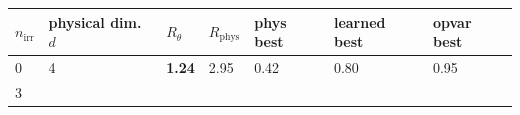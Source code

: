 \documentclass[11pt]{article}
\begin{document}
\begin{longtable}[]{@{}lllllll@{}}
\toprule
\begin{minipage}[b]{0.12\columnwidth}\raggedright
\(n_{\text{irr}}\)\strut
\end{minipage} & \begin{minipage}[b]{0.12\columnwidth}\raggedright
physical dim. \(d\)\strut
\end{minipage} & \begin{minipage}[b]{0.12\columnwidth}\raggedright
\(R_\theta\)\strut
\end{minipage} & \begin{minipage}[b]{0.12\columnwidth}\raggedright
\(R_{\text{phys}}\)\strut
\end{minipage} & \begin{minipage}[b]{0.12\columnwidth}\raggedright
phys best\strut
\end{minipage} & \begin{minipage}[b]{0.12\columnwidth}\raggedright
learned best\strut
\end{minipage} & \begin{minipage}[b]{0.12\columnwidth}\raggedright
opvar best\strut
\end{minipage}\tabularnewline
\midrule
\endhead
\begin{minipage}[t]{0.12\columnwidth}\raggedright
0\strut
\end{minipage} & \begin{minipage}[t]{0.12\columnwidth}\raggedright
4\strut
\end{minipage} & \begin{minipage}[t]{0.12\columnwidth}\raggedright
\textbf{1.24}\strut
\end{minipage} & \begin{minipage}[t]{0.12\columnwidth}\raggedright
2.95\strut
\end{minipage} & \begin{minipage}[t]{0.12\columnwidth}\raggedright
0.42\strut
\end{minipage} & \begin{minipage}[t]{0.12\columnwidth}\raggedright
0.80\strut
\end{minipage} & \begin{minipage}[t]{0.12\columnwidth}\raggedright
0.95\strut
\end{minipage}\tabularnewline
\begin{minipage}[t]{0.12\columnwidth}\raggedright
3\strut
\end{minipage} & \begin{minipage}[t]{0.12\columnwidth}\raggedright

\end{minipage}
\end{longtable}
\end{document}
